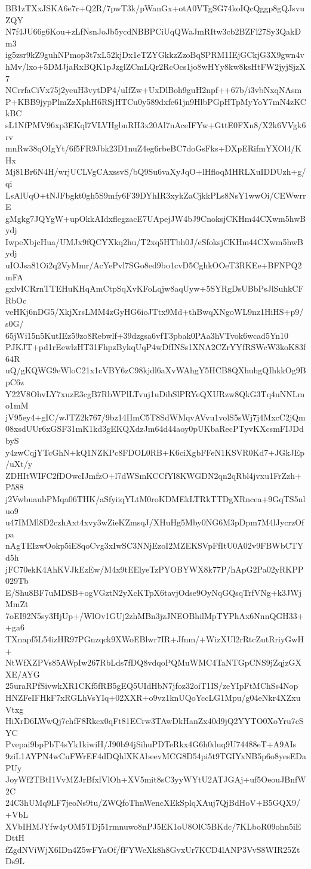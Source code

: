 BB1zTXxJSKA6e7r+Q2R/7pwT3k/pWanGx+otA0VTgSG74koIQcQggp8gQJsvuZQY
N7f4JU66g6Kou+zLfNsnJoJb5ycdNBBPCiUqQWaJmRItw3cb2BZFl27Sy3QakDm3
ig5zsr9kZ9guhNPmop3t7xL52kjDx1eTZYGkkzZzoBqSPRM1IEjGCkjG3X9gwn4v
hMv/lxo+5DMJjaRxBQK1pJzglZCmLQr2RcOcs1jo8wHYy8kw8ksHtFW2jyjSjzX7
NCrrfaCiVx75j2yeuH3vytDP4/uIfZw+UxDlBoh9guH2npf++67b/i3vbNxqNAsm
P+KBB9jypPlmZzXphH6RSjHTCu0y589dxfe61jn9HlbPGpHTpMyYoY7mN4zKCkBC
sL1NfPMV96xp3EKql7VLVHgbnRH3x20Al7nAceIFYw+GttE0FXn8/X2k6VVgk6rv
mnRw38qOIgYt/6f5FR9Jbk23D1nuZ4eg6rbeBC7doGsFks+DXpERifmYXOl4/KHx
Mj81Br6N4H/wrjUCLVgCAxssvS/bQ9Su6vaXyJqO+lHfloqMHRLXuIDDUzh+g/qi
LsAlUqO+tNJFbgkt0gh5S9mfy6F39DYhIR3xykZaCjkkPLs8NsY1wwOi/CEWwrrE
gMgkg7JQYgW+upOkkAIdxflegzacE7UApejJW4bJ9CnoksjCKHm44CXwm5hwBydj
IwpeXbjcHua/UMJx9fQCYXkq2hu/T2xq5HTbh0J/eSfoksjCKHm44CXwm5hwBydj
uIOJsa81Oi2q2VyMmr/AcYePvl7SGo8ed9bo1cvD5CghkOOeT3RKEe+BFNPQ2mFA
gxlvICRrnTTEHuKHqAmCtpSqXvKFoLqjw8aqUyw+5SYRgDsUBbPsJlSuhkCFRbOc
veHKj6nDG5/XkjXrsLMM4zGyHG6ioJTtx9Md+thBwqXNgoWL9nz1HiHS+p9/s0G/
65jWi15n5KutIEz59zo8Rebwlf+39dzgsa6vfT3pbak0PAa3hVTvok6wcad5Yn10
PJKJT+pd1rEewlzHT31FhpzBykqUqP4wDfINSs1XNA2CZrYYfRSWcW3koK83f64R
uQ/gKQWG9eWloC21x1cVBY6zC98kjdl6aXvWAhgY5HCB8QXhuhgQIhkkOg9BpC6z
Y22V8OhvLY7xuzE3cgB7RbWPlLTvuj1uDibSlPRYeQXURzw8QkG3Tq4uNNLmo1mM
jV95ey4+gIC/wJTZ2k767/9bz14IImC5T8SdWMqvAVvu1volS5sWj7j4MxcC2jQm
08xsdUUr6xGSF31mK1kd3gEKQXdzJm64d44aoy0pUKbaRecPTyvKXcsmFIJDdbyS
y4zwCqjYTcGhN+kQ1NZKPc8FDOL0RB+K6ciXgbFFeN1KSVR0Kd7+JGkJEp/uXt/y
ZDHItWIFC2fDOwcIJmfzO+l7dWSmKCCfYl8KWGDN2qn2qRbl4jvxu1FrZzh+P588
j2VwbuaubPMqa06THK/aSfyiiqYLtM0roKDMEkLTRkTTDgXRncea+9GqTS5nluo9
u47IMMl8D2czhAxt4xvy3wZieKZmsqJ/XHuHg5Mby0NG6M3pDpm7M4lJycrzOfpa
nAgTEIzwOokp5iE8qoCvg3xIwSC3NNjEzoI2MZEKSVpFfItU0A02v9FBWbCTYd5h
jFC70ekK4AhKVJkEzEw/M4x9tEElyeTzPYOBYWX8k77P/hApG2Pa02yRKPP029Tb
E/Shu8BF7uMDSB+ogVGztN2yXcKTpX6tavjOdse9OyNqGQsqTrfVNg+k3JWjMmZt
7oEI92N5sy3HjUp+/WlOv1GUj2zhMBn3jzJNEOBhilMpTYPhAx6NnnQGH33++ga6
TXnapf5L54izHR97PGnzqck9XWoEBlwr7IR+Jfnm/+WizXUl2rRtcZutRriyGwH+
NtWfXZPVs85AWpIw267RbLds7fDQ8vdqoPQMuWMC4TaNTGpCNS9jZqjzGXXE/AYG
25uraRPfSivwkXR1CKf5fRB5gEQ5UIdHbN7jfoz32oiT1IS/zeYIpFtMChSs4Nop
HNZFeIFHkF7xRGLhVsYIq+02XXR+o9vz1knUQoYccLG1Mpu/g04eNkr4XZxuVtxg
HiXrD6LWwQj7chfF8Rkcx0qFt81ECrw3TAwDkHanZx40d9jQ2YYTO0XoYru7cSYC
Pvepai9bpPbT4sYk1kiwiH/J90b94jSihuPDTeRkx4G6h0duq9U74488eT+A9AIs
9ziL1AYPN4wCuFWrEF4dDQhlXKAbeevMCG8D54pi5t9TGIYxNB5p6o8yesEDaPUy
JoyWf2TBtI1VvMZJrBfxlVlOh+XV5mit8sC3yyWYtU2ATJGAj+uf5OeouJBnfW2C
24C3hUMq9LF7jeoNs9tu/ZWQfoThnWencXEkSplqXAuj7QjBdHoV+B5GQX9/+VbL
XVbIHMJYfw4yOM5TDj51rmnuwo8nPJ5EK1oU8OlC5BKdc/7KLboR09ohn5iEDttH
fZgdNViWjX6IDn4Z5wFYaOf/fFYWeXk8h8GvxUr7KCD4lANP3VvS8WIR25ZtDs9L
